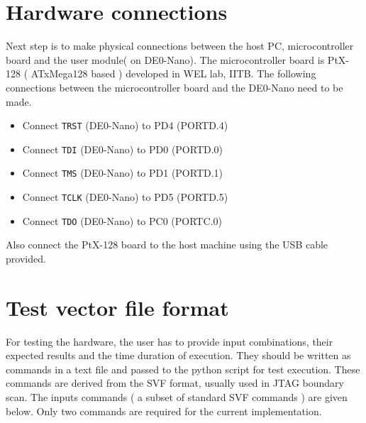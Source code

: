 \documentclass[a4paper,11pt]{article}
\begin{document}

\section{Hardware connections}
Next step is to make physical connections between the host PC, microcontroller board and the user module( on DE0-Nano). The microcontroller board is PtX-128 ( ATxMega128 based ) developed in WEL lab, IITB. The following connections between the microcontroller board and the DE0-Nano need to be made.

\begin{itemize}
\item Connect \texttt{TRST} (DE0-Nano) to PD4 (PORTD.4)
\item Connect \texttt{TDI} (DE0-Nano) to PD0 (PORTD.0)
\item Connect \texttt{TMS} (DE0-Nano) to PD1 (PORTD.1)
\item Connect \texttt{TCLK} (DE0-Nano) to PD5 (PORTD.5)
\item Connect \texttt{TDO} (DE0-Nano) to PC0 (PORTC.0)
\end{itemize}

Also connect the PtX-128 board to the host machine using the USB cable provided.

\section{Test vector file format}
For testing the hardware, the user has to provide input combinations, their expected results and the time duration of execution. They should be written as commands in a text file and passed to the python script for test execution. These commands are derived from the SVF format, usually used in JTAG boundary scan. The inputs commands ( a subset of standard SVF commands ) are given below. Only two commands are required for the current implementation.
\end{document}
